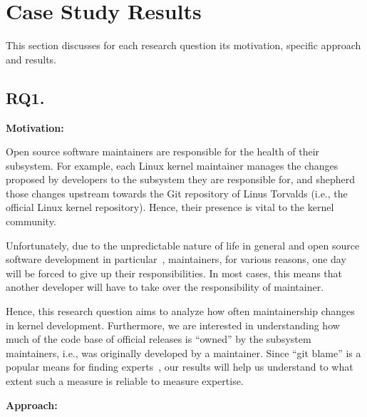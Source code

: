 \section{Case Study Results}
\label{sec:case-study-results}

This section discusses for each research question its motivation, specific approach and results.

\subsection*{RQ1. \rqone}
\label{sec:rq1.-how-does}

{\bf Motivation:} 

Open source software maintainers are responsible for the health of their subsystem. For example, each Linux kernel maintainer %
manages the changes proposed by developers to the subsystem they are responsible for, and shepherd those changes upstream towards the Git repository of Linus Torvalds (i.e., the official Linux kernel repository). Hence, their presence is vital to the kernel community.

Unfortunately, due to the unpredictable nature of life in general and open source software development in particular~\cite{Wu,Zhou}, maintainers, for various reasons, one day will be forced to give up their responsibilities. In most cases, this means that another developer will have to take over the responsibility of maintainer.

Hence, this research question aims to analyze how often maintainership changes in kernel development. Furthermore, we are interested in understanding how much of the code base of official releases is ``owned'' by the subsystem maintainers, i.e., was originally developed by a maintainer. Since ``git blame'' is a popular means for finding experts~\cite{Rahman-2011}, our results will help us understand to what extent such a measure is reliable to measure expertise.%

{\bf Approach:}

